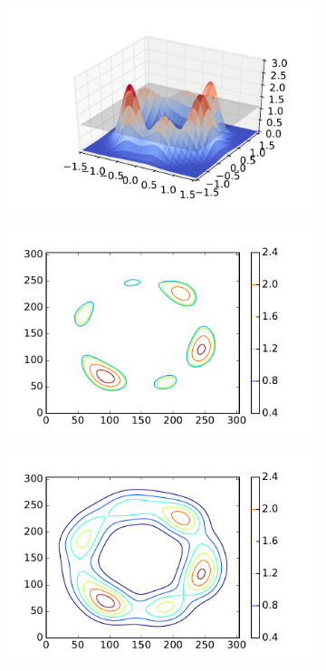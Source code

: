 \documentclass[12pt]{article}
\begin{document}
\begin{figure}
  \begin{subfigure}{.27\linewidth}
    \centering
    \caption{}  
        \includegraphics[width=\linewidth]{tmp2.pdf}
    \label{fig:example_3d}
  \end{subfigure}
    \begin{subfigure}{.25\linewidth}
    \centering
    \caption{}  
        \includegraphics[width=\linewidth]{tmp4.pdf}
    \label{fig:example_contour1}
  \end{subfigure}
    \begin{subfigure}{.25\linewidth}
    \centering
    \caption{}  
        \includegraphics[width=\linewidth]{tmp3.pdf}

\end{subfigure}
\end{figure}
\end{document}
